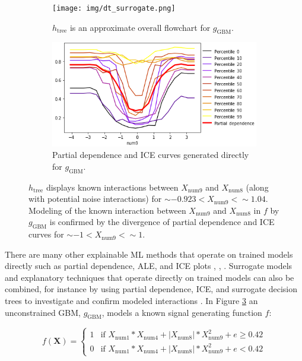 \documentclass[fleqn]{article}
\newcommand{\twopartdef}[4]
{
	\left\{
		\begin{array}{ll}
			#1 & \mbox{if } #2 \\
			#3 & \mbox{if } #4
		\end{array}
	\right.
}
\begin{document}
\begin{figure}
	\begin{subfigure}{.55\textwidth}
		\texttt{[image: img/dt\_surrogate.png]}
  		\caption{$h_{\text{tree}}$ is an approximate overall flowchart for $g_{\text{GBM}}$.}
  		\label{fig:dt_surrogate}
	\end{subfigure}\hspace{5pt}
	\begin{subfigure}{.45\textwidth}
  		\includegraphics[height=.52\linewidth, width=1.02\linewidth]{img/pdp_ice.png}
  		\caption{Partial dependence and ICE curves generated directly for $g_{\text{GBM}}$.}
  		\label{fig:pdp_ice}
	\end{subfigure}
	\caption{$h_{\text{tree}}$ displays known interactions between $X_{\text{num9}}$ and $X_{\text{num8}}$ (along with potential noise interactions) for $\sim -0.923 < X_{\text{num9}} <  \sim 1.04$. Modeling of the known interaction between $X_{\text{num9}}$ and $X_{\text{num8}}$ in $f$ by $g_{\text{GBM}}$ is confirmed by the divergence of partial dependence and ICE curves for $\sim -1 < X_{\text{num9}} <  \sim 1$.}
	\label{fig:pdp_ice_dt_surrogate}
\end{figure}

There are many other explainable ML methods that operate on trained models directly such as partial dependence, ALE, and ICE plots \cite{esl}, \cite{ale_plot}, \cite{ice_plots}. Surrogate models and explanatory techniques that operate directly on trained models can also be combined, for instance by using partial dependence, ICE, and surrogate decision trees to investigate and confirm modeled interactions \cite{art_and_sci}. In Figure \ref{fig:pdp_ice_dt_surrogate} an unconstrained GBM, $g_{\text{GBM}}$, models a known signal generating function $f$:

\begin{equation}
\label{eq:f}
f(\mathbf{X}) = \twopartdef {1} {X_{\text{num}1} * X_{\text{num}4} + |X_{\text{num}8}| * X_{\text{num}9}^2 + e \geq 0.42} {0} {X_{\text{num}1} * X_{\text{num}4} + |X_{\text{num}8}| * X_{\text{num}9}^2 + e < 0.42}
\end{equation}
\end{document}
